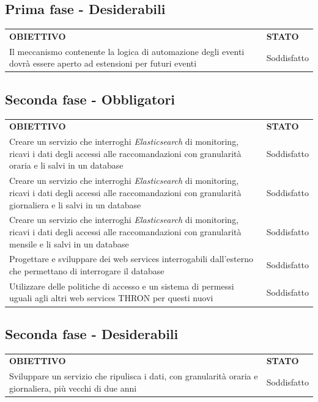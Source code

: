 \documentclass[a4paper, 12pt, twoside, openright]{book}
\begin{document}
\subsection{Prima fase - Desiderabili}
\begin{tabular}{ m{26em} | m{5em} }
	\rowcolor{gray!50}
	\textbf{OBIETTIVO} & \textbf{STATO}\\
	Il meccanismo contenente la logica di automazione degli eventi dovrà essere aperto ad estensioni per futuri eventi & Soddisfatto\\
\end{tabular}

\subsection{Seconda fase - Obbligatori}
\begin{tabular}{ m{26em} | m{5em} }
	\rowcolor{gray!50}
	\textbf{OBIETTIVO} & \textbf{STATO}\\
	Creare un servizio che interroghi \textit{Elasticsearch} di monitoring, ricavi i dati degli accessi alle raccomandazioni con granularità oraria e li salvi in un database & Soddisfatto\\
	Creare un servizio che interroghi \textit{Elasticsearch} di monitoring, ricavi i dati degli accessi alle raccomandazioni con granularità giornaliera e li salvi in un database & Soddisfatto\\
	Creare un servizio che interroghi \textit{Elasticsearch} di monitoring, ricavi i dati degli accessi alle raccomandazioni con granularità mensile e li salvi in un database & Soddisfatto\\
	Progettare e sviluppare dei web services interrogabili dall'esterno che permettano di interrogare il database & Soddisfatto\\
	Utilizzare delle politiche di accesso e un sistema di permessi uguali agli altri web services THRON per questi nuovi & Soddisfatto\\
\end{tabular}

\subsection{Seconda fase - Desiderabili}
\begin{tabular}{ m{26em} | m{5em} }
	\rowcolor{gray!50}
	\textbf{OBIETTIVO} & \textbf{STATO}\\
	Sviluppare un servizio che ripulisca i dati, con granularità oraria e giornaliera, più vecchi di due anni & Soddisfatto\\
\end{tabular}
\end{document}
